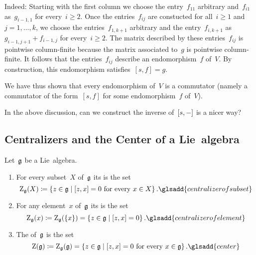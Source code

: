 \begin{example}
	Indeed:
	Starting with the first column we choose the entry~$f_{11}$ arbitrary and~$f_{i1}$ as~$g_{i-1,1}$ for every~$i \geq 2$.
	Once the entries~$f_{ij}$ are constucted for all~$i \geq 1$ and~$j = 1, \dotsc, k$, we choose the entries~$f_{1,k+1}$ arbitrary and the entry~$f_{i,k+1}$ as~$g_{i-1, j+1} + f_{i-1, j}$ for every~$i \geq 2$.
	The matrix described by these entries~$f_{ij}$ is pointwise column-finite because the matrix associated to~$g$ is pointwise column-finite.
	It follows that the entries~$f_{ij}$ describe an endomorphism~$f$ of~$V$.
	By construction, this endomorphism satisfies~$[s, f] = g$.

	We have thus shown that every endomorphism of~$V$ is a commutator (namely a commutator of the form~$[s, f]$ for some endomorphism~$f$ of~$V$).
\end{example}


\begin{question}
	In the above discussion, can we construct the inverse of~$[s, -]$ is a nicer way?
\end{question}




\subsection{Centralizers and the Center of a Lie~algebra}


\begin{definition}
	Let~$\mathfrak{g}$ be a Lie~algebra.
	\begin{enumerate}
		\item
			For every subset~$X$ of~$\mathfrak{g}$ its  is the set
			\[
				\centerlie_{\glie}(X)
				\defined
				\{
					z \in \glie
				\suchthat
					\text{$[z,x] = 0$ for every~$x \in X$}
				\} \,.
				\glsadd{centralizer of subset}
			\]
		\item
			For any element~$x$ of~$\mathfrak{g}$ its  is the set
			\[
				\centerlie_{\glie}(x)
				\defined
				\centerlie_{\glie}(\{x\})
				=
				\{
					z \in \glie
				\suchthat{} %
					[z,x] = 0
				\} \,.
				\glsadd{centralizer of element}
			\]
		\item
			The  of~$\mathfrak{g}$ is the set
			\[
				\centerlie(\glie)
				\defined
				\centerlie_{\glie}(\glie)
				=
				\{
					z \in \glie
				\suchthat
					\text{$[z,x] = 0$ for every~$x \in \glie$}
				\} \,.
				\glsadd{center}
			\]
	\end{enumerate}
\end{definition}


